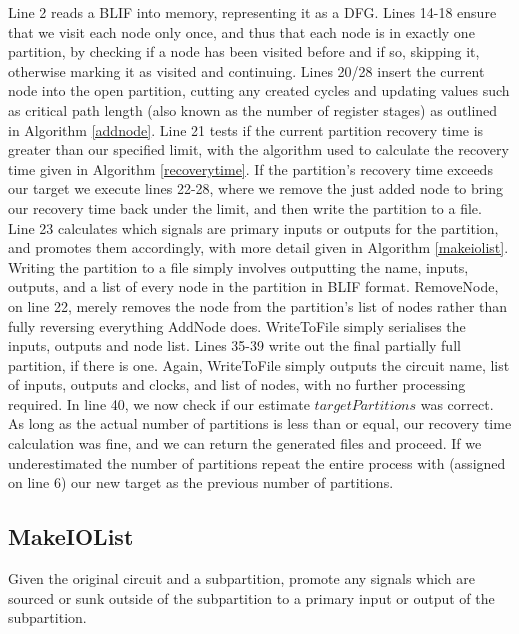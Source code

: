 \documentclass[12pt,final,oneside]{dwThesis} %
\begin{document}
   \FloatBarrier
   Line 2 reads a \gls{BLIF} into memory, representing it as a \gls{DFG}.
   Lines 14-18 ensure that we visit each node only once, and thus that each node is
   in exactly one partition, by checking if a node has been visited before and
   if so, skipping it, otherwise marking it as visited and continuing.  Lines
   20/28 insert the current node into the open partition, cutting any created
   cycles and updating values such as critical path length (also known as the number of register stages)
   as outlined in
   Algorithm \ref{addnode}.  Line 21 tests if the current partition recovery
   time is greater than our specified limit, with the algorithm used to
   calculate the recovery time given in Algorithm \ref{recoverytime}.  If the
   partition's recovery time exceeds our target we execute lines 22-28, where
   we remove the just added node to bring our recovery time back under the
   limit, and then write the partition to a file.  Line 23 calculates which
   signals are primary inputs or outputs for the partition, and promotes them
   accordingly, with more detail given in Algorithm \ref{makeiolist}.  Writing
   the partition to a file simply involves outputting the name, inputs,
   outputs, and a list of every node in the partition in \gls{BLIF} format.
   RemoveNode, on line 22, merely removes the node from the partition's list of
   nodes rather than fully reversing everything AddNode does. WriteToFile
   simply serialises the inputs, outputs and node list.  Lines 35-39 write out
   the final partially full partition, if there is one. Again, WriteToFile
   simply outputs the circuit name, list of inputs, outputs and clocks, and
   list of nodes, with no further processing required.
   In line 40, we now check if our estimate $targetPartitions$ was correct. As long as the actual number of partitions is less than or equal, our recovery time
   calculation was fine, and we can return the generated files and proceed.
   If we underestimated the number of partitions repeat the entire process with (assigned on line 6) our new target as the previous number of partitions.


   \newpage 
   \subsection{MakeIOList}
   Given the original circuit and a
   subpartition, promote any signals which are sourced or sunk outside of the
   subpartition to a primary input or output of the subpartition.
\end{document}
